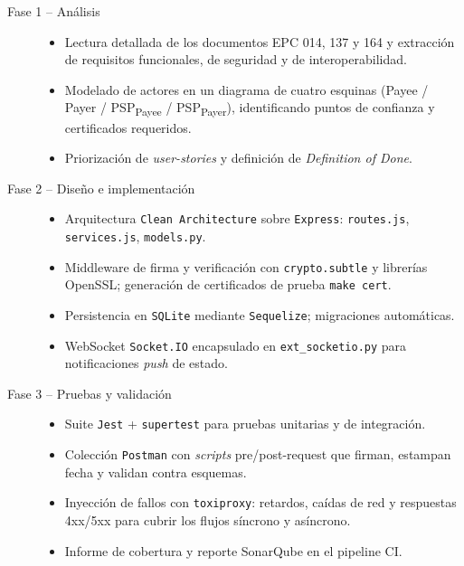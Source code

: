 \begin{description}
  \item[Fase 1 – Análisis]%
        \begin{itemize}
        \item Lectura detallada de los documentos EPC 014, 137 y 164 y extracción
              de requisitos funcionales, de seguridad y de interoperabilidad.
        \item Modelado de actores en un diagrama de cuatro esquinas
              (Payee / Payer / PSP\textsubscript{Payee} / PSP\textsubscript{Payer}),
              identificando puntos de confianza y certificados requeridos.
        \item Priorización de \emph{user-stories} y definición de \emph{Definition of Done}.
        \end{itemize}

  \item[Fase 2 – Diseño e implementación]%
        \begin{itemize}
        \item Arquitectura \texttt{Clean Architecture} sobre \texttt{Express}:
              \texttt{routes.js}, \texttt{services.js}, \texttt{models.py}.
        \item Middleware de firma y verificación con \texttt{crypto.subtle} y
              librerías OpenSSL; generación de certificados de prueba
              \texttt{make cert}.
        \item Persistencia en \texttt{SQLite} mediante \texttt{Sequelize};
              migraciones automáticas.
        \item WebSocket \texttt{Socket.IO} encapsulado en \texttt{ext\_socketio.py}
              para notificaciones \emph{push} de estado.
        \end{itemize}

  \item[Fase 3 – Pruebas y validación]%
        \begin{itemize}
        \item Suite \texttt{Jest} + \texttt{supertest} para pruebas unitarias y de
              integración.
        \item Colección \texttt{Postman} con \emph{scripts} pre/post-request que
              firman, estampan fecha y validan contra esquemas.
        \item Inyección de fallos con \texttt{toxiproxy}: retardos, caídas de red
              y respuestas 4xx/5xx para cubrir los flujos síncrono y asíncrono.
        \item Informe de cobertura y reporte SonarQube en el pipeline CI.
        \end{itemize}
\end{description}

